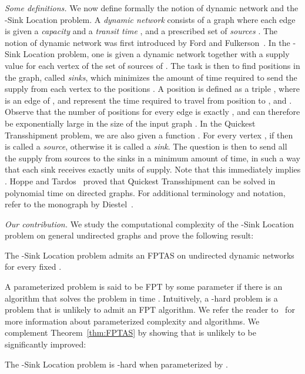 \documentclass[a4paper,10pt]{llncs}
\begin{document}
{\em Some definitions.} We now define formally the notion of dynamic network and the -{\sc Sink Location} problem. A {\em dynamic network}  consists of a graph  where each edge  is given a {\em capacity}  and a {\em transit time} , and a prescribed set of {\em sources} . The notion of dynamic network was first introduced by Ford and Fulkerson~\cite{FF62}. In the -{\sc Sink Location} problem, one is given a dynamic network  together with a supply value  for each vertex  of the set  of sources of . The task is then to find  positions  in the graph, called {\em sinks}, which minimizes the amount of time required to send the supply  from each vertex  to the positions . A position  is defined as a triple , where  is an edge of , and  represent the time required to travel from position  to , and . Observe that the number of positions for every edge  is exactly , and can therefore be exponentially large in the size of the input graph .
In the {\sc Quickest Transshipment} problem, we are also given a function . For every vertex , if  then  is called a {\em source}, otherwise it is called a {\em sink}. The question is then to send all the supply from sources to the sinks in a minimum amount of time, in such a way that each sink  receives exactly  units of supply. Note that this immediately implies . Hoppe and Tardos~\cite{HT00} proved that {\sc Quickest Transshipment} can be solved in polynomial time on directed graphs.
For additional terminology and notation, refer to the monograph by Diestel~\cite{Die05}.

{\em Our contribution.} We study the computational complexity of the -{\sc Sink Location} problem on general undirected graphs and prove the following result:

\begin{theorem}
\label{thm:FPTAS}
The -{\sc Sink Location} problem admits an FPTAS on undirected dynamic networks for every fixed . 
\end{theorem}

A parameterized problem is said to be FPT  by some parameter  if there is an algorithm that solves the problem in time . Intuitively, a -hard problem is a problem that is unlikely to admit an FPT algorithm. We refer the reader to~\cite{FG06,Nie06} for more information about parameterized complexity and algorithms.
We complement Theorem~\ref{thm:FPTAS} by showing that is unlikely to be significantly improved:

\begin{theorem}
\label{thm:W-hard}
The -{\sc Sink Location} problem is -hard when parameterized by . 
\end{theorem}
\end{document}
